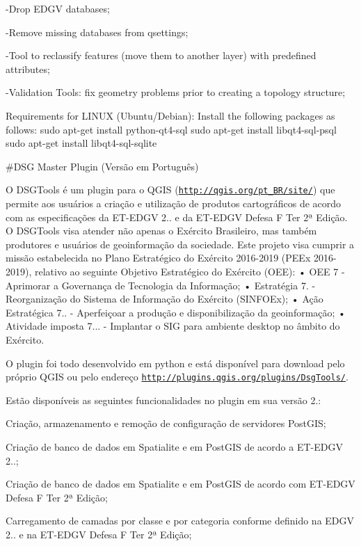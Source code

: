 -\/\+Drop E\+D\+GV databases;

-\/\+Remove missing databases from qsettings;

-\/\+Tool to reclassify features (move them to another layer) with predefined attributes;

-\/\+Validation Tools\+: fix geometry problems prior to creating a topology structure;

Requirements for L\+I\+N\+UX (Ubuntu/\+Debian)\+: Install the following packages as follows\+: sudo apt-\/get install python-\/qt4-\/sql sudo apt-\/get install libqt4-\/sql-\/psql sudo apt-\/get install libqt4-\/sql-\/sqlite 

 \#\+D\+SG Master Plugin (Versão em Português)

O D\+S\+G\+Tools é um plugin para o Q\+G\+IS (\href{http://qgis.org/pt_BR/site/}{\tt http\+://qgis.\+org/pt\+\_\+\+B\+R/site/}) que permite aos usuários a criação e utilização de produtos cartográficos de acordo com as especificações da E\+T-\/\+E\+D\+GV 2.. e da E\+T-\/\+E\+D\+GV Defesa F Ter 2ª Edição. O D\+S\+G\+Tools visa atender não apenas o Exército Brasileiro, mas também produtores e usuários de geoinformação da sociedade. Este projeto visa cumprir a missão estabelecida no Plano Estratégico do Exército 2016-\/2019 (P\+E\+Ex 2016-\/2019), relativo ao seguinte Objetivo Estratégico do Exército (O\+EE)\+: • O\+EE 7 -\/ Aprimorar a Governança de Tecnologia da Informação; • Estratégia 7. -\/ Reorganização do Sistema de Informação do Exército (S\+I\+N\+F\+O\+Ex); • Ação Estratégica 7.. -\/ Aperfeiçoar a produção e disponibilização da geoinformação; • Atividade imposta 7... -\/ Implantar o S\+IG para ambiente desktop no âmbito do Exército.

O plugin foi todo desenvolvido em python e está disponível para download pelo próprio Q\+G\+IS ou pelo endereço \href{http://plugins.qgis.org/plugins/DsgTools/}{\tt http\+://plugins.\+qgis.\+org/plugins/\+Dsg\+Tools/}.

Estão disponíveis as seguintes funcionalidades no plugin em sua versão 2.\+:

Criação, armazenamento e remoção de configuração de servidores Post\+G\+IS;

Criação de banco de dados em Spatialite e em Post\+G\+IS de acordo a E\+T-\/\+E\+D\+GV 2..;

Criação de banco de dados em Spatialite e em Post\+G\+IS de acordo com E\+T-\/\+E\+D\+GV Defesa F Ter 2ª Edição;

Carregamento de camadas por classe e por categoria conforme definido na E\+D\+GV 2.. e na E\+T-\/\+E\+D\+GV Defesa F Ter 2ª Edição;

